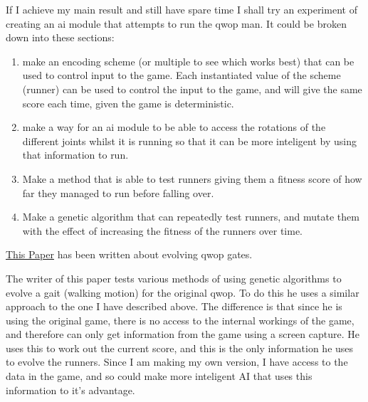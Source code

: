 \documentclass[12pt,a4paper,twoside]{article}
\begin{document}

If I achieve my main result and still have spare time I shall try an experiment of creating an ai module that attempts to run the qwop man. It could be broken down into these sections:

\begin{enumerate}
\item make an encoding scheme (or multiple to see which works best) that can be used to control input to the game. Each instantiated value of the scheme (runner) can be used to control the input to the game, and will give the same score each time, given the game is deterministic.

\item  make a way for an ai module to be able to access the rotations of the different joints whilst it is running so that it can be more inteligent by using that information to run.

\item Make a method that is able to test runners giving them a fitness score of how far they managed to run before falling over.
  
\item Make a genetic algorithm that can repeatedly test runners, and mutate them with the effect of increasing the fitness of the runners over time.
\end{enumerate}

 
\href{https://dl.acm.org/citation.cfm?id=2598248}{This Paper} has been written about evolving qwop gates.

The writer of this paper tests various methods of using genetic algorithms to evolve a gait (walking motion) for the original qwop.
To do this he uses a similar approach to the one I have described above. The difference is that since he is using the original game, there is no access to the internal workings of the game, and therefore can only get information from the game using a screen capture. He uses this to work out the current score, and this is the only information he uses to evolve the runners. Since I am making my own version, I have access to the data in the game, and so could make more inteligent AI that uses this information to it's advantage.
\end{document}
